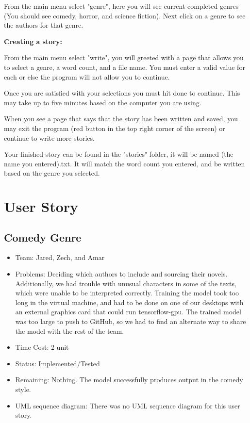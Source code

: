 \documentclass[12pt]{article}
\begin{document}
From the main menu select "genre", here you will see current completed genres (You should see comedy, horror, and science fiction).
Next click on a genre to see the authors for that genre. 

\textbf{Creating a story:}

From the main menu select "write", you will greeted with a page that allows you to select a genre, a word count, and a file name. You must enter a valid value for each or else the program will not allow you to continue. 

Once you are satisfied with your selections you must hit done to continue. This may take up to five minutes based on the computer you are using.

When you see a page that says that the story has been written and saved, you may exit the program (red button in the top right corner of the screen) or continue to write more stories. 

Your finished story can be found in the "stories" folder, it will be named (the name you entered).txt. It will match the word count you entered, and be written based on the genre you selected. 

\section{User Story}

\subsection{Comedy Genre}
\begin{itemize}
\item Team: Jared, Zech, and Amar
\item Problems: Deciding which authors to include and sourcing their novels. Additionally, we had trouble with unusual characters in some of the texts, which were unable to be interpreted correctly. Training the model took too long in the virtual machine, and had to be done on one of our desktops with an external graphics card that could run tensorflow-gpu. The trained model was too large to push to GitHub, so we had to find an alternate way to share the model with the rest of the team.
\item Time Cost: 2 unit 
\item Status: Implemented/Tested
\item Remaining: Nothing. The model successfully produces output in the comedy style.
\item UML sequence diagram: There was no UML sequence diagram for this user story.
\end{itemize}
\end{document}
